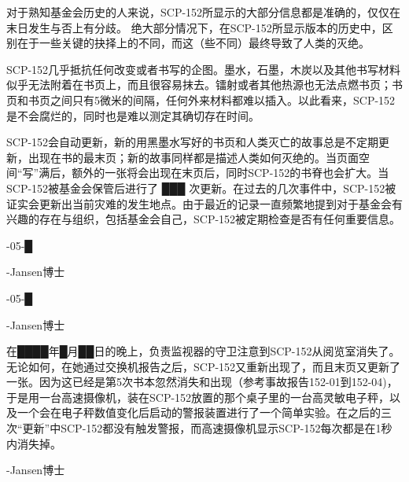 对于熟知基金会历史的人来说，SCP-152所显示的大部分信息都是准确的，仅仅在末日发生与否上有分歧。 绝大部分情况下，在SCP-152所显示版本的历史中，区别在于一些关键的抉择上的不同，而这（些不同）最终导致了人类的灭绝。

SCP-152几乎抵抗任何改变或者书写的企图。墨水，石墨，木炭以及其他书写材料似乎无法附着在书页上，而且很容易抹去。镭射或者其他热源也无法点燃书页；书页和书页之间只有5微米的间隔，任何外来材料都难以插入。以此看来，SCP-152是不会腐烂的，同时也是难以测定其确切存在时间。

SCP-152会自动更新，新的用黑墨水写好的书页和人类灭亡的故事总是不定期更新，出现在书的最末页；新的故事同样都是描述人类如何灭绝的。当页面空间“写”满后，额外的一张将会出现在末页后，同时SCP-152的书脊也会扩大。当SCP-152被基金会保管后进行了 ███ 次更新。在过去的几次事件中，SCP-152被证实会更新出当前灾难的发生地点。由于最近的记录一直频繁地提到对于基金会有兴趣的存在与组织，包括基金会自己，SCP-152被定期检查是否有任何重要信息。

-05-█

-Jansen博士

-05-█

-Jansen博士

在████年█月██日的晚上，负责监视器的守卫注意到SCP-152从阅览室消失了。无论如何，在她通过交换机报告之后，SCP-152又重新出现了，而且末页又更新了一张。因为这已经是第5次书本忽然消失和出现（参考事故报告152-01到152-04)，于是用一台高速摄像机，装在SCP-152放置的那个桌子里的一台高灵敏电子秤，以及一个会在电子秤数值变化后启动的警报装置进行了一个简单实验。在之后的三次“更新”中SCP-152都没有触发警报，而高速摄像机显示SCP-152每次都是在1秒内消失掉。

-Jansen博士
